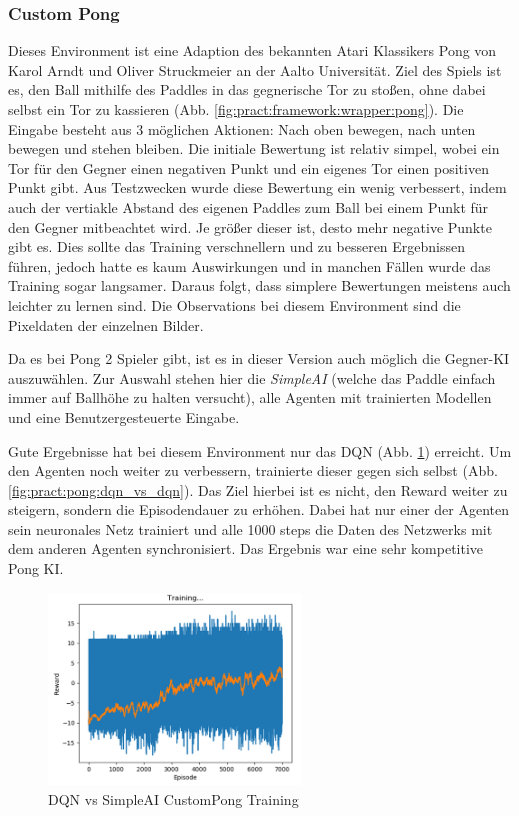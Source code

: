 \documentclass[12pt,a4paper]{article}
\begin{document}
\subsubsection{Custom Pong}
Dieses Environment ist eine Adaption des bekannten Atari Klassikers Pong von Karol Arndt und Oliver Struckmeier an der Aalto Universität.
Ziel des Spiels ist es, den Ball mithilfe des Paddles in das gegnerische Tor zu stoßen, ohne dabei selbst ein Tor zu kassieren (Abb. \ref{fig:pract:framework:wrapper:pong}).
Die Eingabe besteht aus 3 möglichen Aktionen: Nach oben bewegen, nach unten bewegen und stehen bleiben.
Die initiale Bewertung ist relativ simpel, wobei ein Tor für den Gegner einen negativen Punkt und ein eigenes Tor einen positiven Punkt gibt.
Aus Testzwecken wurde diese Bewertung ein wenig verbessert, indem auch der vertiakle Abstand des eigenen Paddles zum Ball bei einem Punkt für den Gegner mitbeachtet wird.
Je größer dieser ist, desto mehr negative Punkte gibt es.
Dies sollte das Training verschnellern und zu besseren Ergebnissen führen, jedoch hatte es kaum Auswirkungen und in manchen Fällen wurde das Training sogar langsamer.
Daraus folgt, dass simplere Bewertungen meistens auch leichter zu lernen sind.
Die Observations bei diesem Environment sind die Pixeldaten der einzelnen Bilder.

Da es bei Pong 2 Spieler gibt, ist es in dieser Version auch möglich die Gegner-KI auszuwählen.
Zur Auswahl stehen hier die \textit{SimpleAI} (welche das Paddle einfach immer auf Ballhöhe zu halten versucht), alle Agenten mit trainierten Modellen und eine Benutzergesteuerte Eingabe.

Gute Ergebnisse hat bei diesem Environment nur das DQN (Abb. \ref{fig:pract:pong:dqn_vs_simple}) erreicht.
Um den Agenten noch weiter zu verbessern, trainierte dieser gegen sich selbst (Abb. \ref{fig:pract:pong:dqn_vs_dqn}).
Das Ziel hierbei ist es nicht, den Reward weiter zu steigern, sondern die Episodendauer zu erhöhen.
Dabei hat nur einer der Agenten sein neuronales Netz trainiert und alle 1000 steps die Daten des Netzwerks mit dem anderen Agenten synchronisiert.
Das Ergebnis war eine sehr kompetitive Pong KI.

\begin{figure}[!h]
	\centering
	\includegraphics[width=0.6\textwidth]{gfx/dqn_custompong_model_7000}
	\caption{DQN vs SimpleAI CustomPong Training}
	\label{fig:pract:pong:dqn_vs_simple}
\end{figure}
\end{document}
